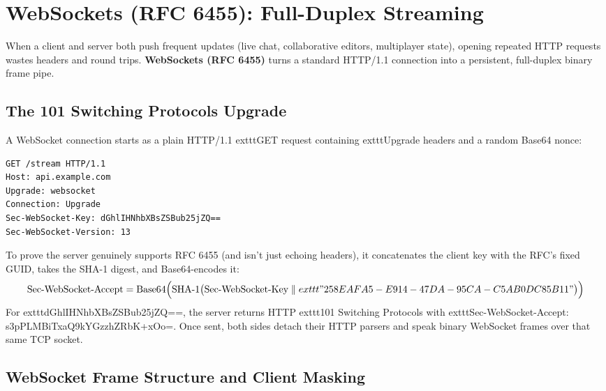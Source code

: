 \section{WebSockets (RFC 6455): Full-Duplex Streaming}

When a client and server both push frequent updates (live chat, collaborative editors, multiplayer state), opening repeated HTTP requests wastes headers and round trips. \textbf{WebSockets (RFC 6455)} turns a standard HTTP/1.1 connection into a persistent, full-duplex binary frame pipe.

\subsection{The 101 Switching Protocols Upgrade}

A WebSocket connection starts as a plain HTTP/1.1 	exttt{GET} request containing 	exttt{Upgrade} headers and a random Base64 nonce:

\begin{lstlisting}[language=sh,caption={Client WebSocket Upgrade Request}]
GET /stream HTTP/1.1
Host: api.example.com
Upgrade: websocket
Connection: Upgrade
Sec-WebSocket-Key: dGhlIHNhbXBsZSBub25jZQ==
Sec-WebSocket-Version: 13
\end{lstlisting}

To prove the server genuinely supports RFC 6455 (and isn't just echoing headers), it concatenates the client key with the RFC's fixed GUID, takes the SHA-1 digest, and Base64-encodes it:
$$\text{Sec-WebSocket-Accept} = \text{Base64}\Big(\text{SHA-1}\big(\text{Sec-WebSocket-Key} \;\Vert\; 	exttt{"258EAFA5-E914-47DA-95CA-C5AB0DC85B11"}\big)\Big)$$
For 	exttt{dGhlIHNhbXBsZSBub25jZQ==}, the server returns HTTP 	exttt{101 Switching Protocols} with 	exttt{Sec-WebSocket-Accept: s3pPLMBiTxaQ9kYGzzhZRbK+xOo=}. Once sent, both sides detach their HTTP parsers and speak binary WebSocket frames over that same TCP socket.

\subsection{WebSocket Frame Structure and Client Masking}


